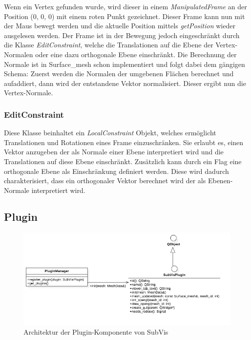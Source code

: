 Wenn ein Vertex gefunden wurde, wird dieser in einem \emph{ManipulatedFrame} an der Position (0, 0, 0) mit einem roten Punkt gezeichnet. 
Dieser Frame kann nun mit der Maus bewegt werden und die aktuelle Position mittels \emph{getPosition} wieder ausgelesen werden.
Der Frame ist in der Bewegung jedoch eingeschränkt durch die Klasse \emph{EditConstraint}, welche die Translationen auf die Ebene der Vertex-Normalen oder eine dazu orthogonale Ebene einschränkt.
Die Berechnung der Normale ist in Surface\_mesh schon implementiert und folgt dabei dem gängigen Schema:
Zuerst werden die Normalen der umgebenen Flächen berechnet und aufaddiert, dann wird der entstandene Vektor normalisiert. 
Dieser ergibt nun die Vertex-Normale.

\subsubsection{EditConstraint}

Diese Klasse beinhaltet ein \emph{LocalConstraint} Objekt, welches ermöglicht Translationen und Rotationen eines Frame einzuschränken.
Sie erlaubt es, einen Vektor anzugeben der als Normale einer Ebene interpretiert wird und die Translationen auf diese Ebene einschränkt.
Zusätzlich kann durch ein Flag eine orthogonale Ebene als Einschränkung definiert werden. 
Diese wird dadurch charakterisiert, dass ein orthogonaler Vektor berechnet wird der als Ebenen-Normale interpretiert wird.


\subsection{Plugin}

\begin{figure}
  \centering
  \includegraphics[width=\textwidth]{content/media/subvis_architektur_plugin.png}
  \caption{Architektur der Plugin-Komponente von SubVis}
  \label{fig:subvis_architektur_plugin}
\end{figure}

